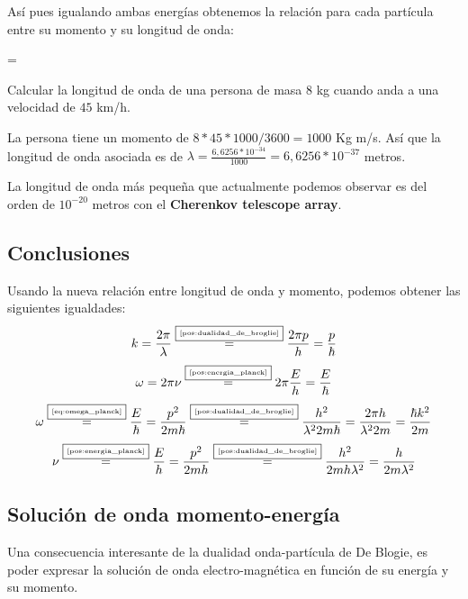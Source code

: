 Así pues igualando ambas energías obtenemos la relación para cada partícula entre su momento y su longitud de onda:
\begin{postulate}
    \label{pos:dualidad_de_broglie}
    \lambda=
\end{postulate}

\begin{example}
    Calcular la longitud de onda de una persona de masa $8$ kg cuando anda a una velocidad de $45$ km/h.

    La persona tiene un momento de $8*45*1000/3600=1000$ Kg m/s. Así que la longitud de onda asociada es de $\lambda=\frac{6,6256*10^{-34}}{1000}=6,6256*10^{-37}$ metros.
\end{example}

\begin{note}
    La longitud de onda más pequeña que actualmente podemos observar es del orden de $10^{-20}$ metros con el \textbf{Cherenkov telescope array}.
\end{note}

\subsection{Conclusiones}
Usando la nueva relación entre longitud de onda y momento, podemos obtener las siguientes igualdades:
\begin{equation}
    \label{eq:k_debroglie}
    k=\frac{2\pi}{\lambda}\overset{\fbox{\tiny \ref{pos:dualidad_de_broglie}}}{=}\frac{2\pi p}{h}=\frac{p}{\hbar}
\end{equation}
\begin{equation}
    \label{eq:omega_planck}
    \omega=2\pi\nu\overset{\fbox{\tiny \ref{pos:energia_planck}}}{=}2\pi\frac{E}{h}=\frac{E}{\hbar}
\end{equation}
\begin{equation}
    \label{eq:omega_debroglie}
    \omega\overset{\fbox{\tiny \ref{eq:omega_planck}}}{=}\frac{E}{\hbar}=\frac{p^2}{2m\hbar}\overset{\fbox{\tiny \ref{pos:dualidad_de_broglie}}}{=}\frac{h^2}{\lambda^2 2m\hbar}=\frac{2\pi h}{\lambda^2 2m}=\frac{\hbar k^2}{2m}
\end{equation}
\begin{equation}
    \label{eq:frecuencia_debroglie}
    \nu\overset{\fbox{\tiny \ref{pos:energia_planck}}}{=}\frac{E}{h}=\frac{p^2}{2mh}\overset{\fbox{\tiny \ref{pos:dualidad_de_broglie}}}{=}\frac{h^2}{2mh\lambda^2}=\frac{h}{2m\lambda^{2}}
\end{equation}

\subsection{Solución de onda momento-energía}\label{subsec:solucion-de-onda-momento-energia}
Una consecuencia interesante de la dualidad onda-partícula de De Blogie, es poder expresar la solución de onda electro-magnética en función de su energía y su momento.

